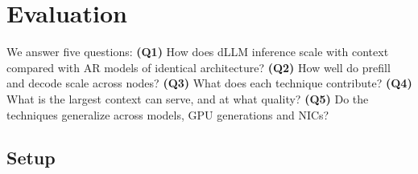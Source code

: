 \section{Evaluation}
\label{sec:eval}

We answer five questions:
\textbf{(Q1)} How does dLLM inference scale with context compared with AR models of identical
architecture?
\textbf{(Q2)} How well do prefill and decode scale across nodes?
\textbf{(Q3)} What does each \sys technique contribute?
\textbf{(Q4)} What is the largest context \sys can serve, and at what quality?
\textbf{(Q5)} Do the techniques generalize across models, GPU generations and NICs?

\subsection{Setup}

\begin{table}[t]
\caption{Hardware. Both clusters share a backend network.}
\label{tab:hw}
\centering\small
{}
\end{table}

\begin{table}[t]
\caption{Models. Each dLLM is paired with an AR model of identical shape where one exists.}
\label{tab:models}
\centering\small
{}
\end{table}

